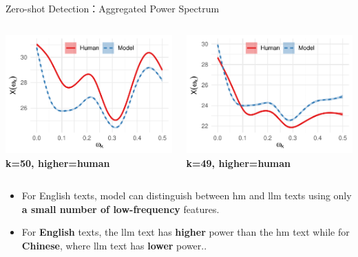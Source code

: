 \documentclass[serif]{beamer}
\begin{document}
\begin{frame}{Zero-shot Detection：Aggregated Power Spectrum}
\begin{columns}[t]
    \centering
    \includegraphics[width=\linewidth]{images/zh_webnovel_aggregated.pdf}
    {\scriptsize \textbf{k=50, higher=human}}

    \centering
    \includegraphics[width=\linewidth]{images/zh_wiki_aggregated.pdf}
    {\scriptsize \textbf{k=49, higher=human}}
\end{columns}

\begin{itemize}
    \item For English texts, model can distinguish between hm and llm texts using only \textbf{a small number of low-frequency} features.
    \item For \textbf{English} texts, the llm text has \textbf{higher} power than the hm text while for \textbf{Chinese}, where llm text has \textbf{lower} power..
\end{itemize}

\end{frame}
\end{document}
